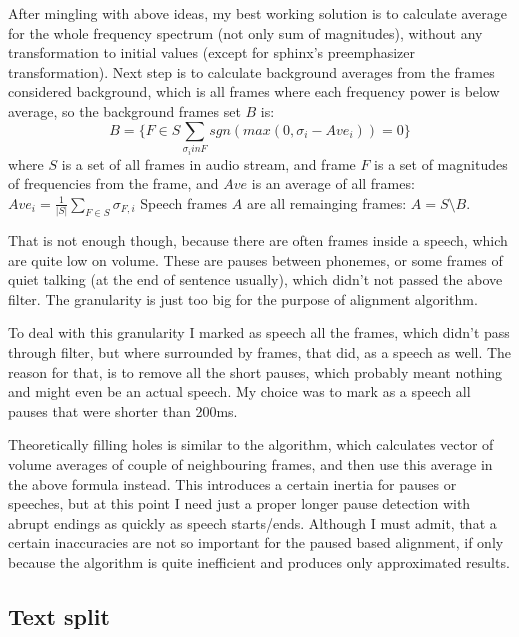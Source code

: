 \documentclass[12pt,a4paper,english]{article}
\begin{document}
After mingling with above ideas, my best working solution is to calculate average for the whole frequency spectrum (not only sum of magnitudes), without any transformation to initial values (except for sphinx's preemphasizer transformation).
Next step is to calculate background averages from the frames considered background, which is all frames where each frequency power is below average, so the background frames set $B$ is:
\begin{equation}
    B = \{ F \in S \sum_{\sigma_i in F} sgn(max(0, \sigma_i - Ave_i)) = 0 \}
\end{equation}
where $S$ is a set of all frames in audio stream, and frame $F$ is a set of magnitudes of frequencies from the frame,
and $Ave$ is an average of all frames: $Ave_i = \frac 1 {|S|} \sum_{F \in S} \sigma_{F, i}$
Speech frames $A$ are all remainging frames: $A = S \setminus B$. \newline

That is not enough though, because there are often frames inside a speech, which are quite low on volume. These are pauses between phonemes, or some frames of quiet talking (at the end of sentence usually), which didn't not passed the above filter. The granularity is just too big for the purpose of alignment algorithm. \newline

To deal with this granularity I marked as speech all the frames, which didn't pass through filter, but where surrounded by frames, that did, as a speech as well.
The reason for that, is to remove all the short pauses, which probably meant nothing and might even be an actual speech. My choice was to mark as a speech all pauses that were shorter than 200ms. \newline

Theoretically filling holes is similar to the algorithm, which calculates vector of volume averages of couple of neighbouring frames, and then use this average in the above formula instead. This introduces a certain inertia for pauses or speeches, but at this point I need just a proper longer pause detection with abrupt endings as quickly as speech starts/ends. Although I must admit, that a certain inaccuracies are not so important for the paused based alignment, if only because the algorithm is quite inefficient and produces only approximated results.

\newpage

\subsection{Text split}
\end{document}

